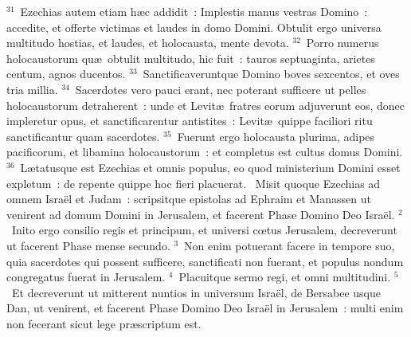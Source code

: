 ${}^{31}$~Ezechias autem etiam h\ae c addidit~: Implestis manus vestras Domino~: accedite, et offerte victimas et laudes in domo Domini. Obtulit ergo universa multitudo hostias, et laudes, et holocausta, mente devota.
${}^{32}$~Porro numerus holocaustorum qu\ae\ obtulit multitudo, hic fuit~: tauros septuaginta, arietes centum, agnos ducentos.
${}^{33}$~Sanctificaveruntque Domino boves sexcentos, et oves tria millia.
${}^{34}$~Sacerdotes vero pauci erant, nec poterant sufficere ut pelles holocaustorum detraherent~: unde et Levit\ae\ fratres eorum adjuverunt eos, donec impleretur opus, et sanctificarentur antistites~: Levit\ae\ quippe faciliori ritu sanctificantur quam sacerdotes.
${}^{35}$~Fuerunt ergo holocausta plurima, adipes pacificorum, et libamina holocaustorum~: et completus est cultus domus Domini.
${}^{36}$~L\ae tatusque est Ezechias et omnis populus, eo quod ministerium Domini esset expletum~: de repente quippe hoc fieri placuerat.
~\lettrine[lines=10,image=true,loversize=0.05,lraise=-0.03]{M}{}isit quoque Ezechias ad omnem Isra\"el et Judam~: scripsitque epistolas ad Ephraim et Manassen ut venirent ad domum Domini in Jerusalem, et facerent Phase Domino Deo Isra\"el.
${}^{2}$~Inito ergo consilio regis et principum, et universi cœtus Jerusalem, decreverunt ut facerent Phase mense secundo.
${}^{3}$~Non enim potuerant facere in tempore suo, quia sacerdotes qui possent sufficere, sanctificati non fuerant, et populus nondum congregatus fuerat in Jerusalem.
${}^{4}$~Placuitque sermo regi, et omni multitudini.
${}^{5}$~Et decreverunt ut mitterent nuntios in universum Isra\"el, de Bersabee usque Dan, ut venirent, et facerent Phase Domino Deo Isra\"el in Jerusalem~: multi enim non fecerant sicut lege pr\ae scriptum est.



